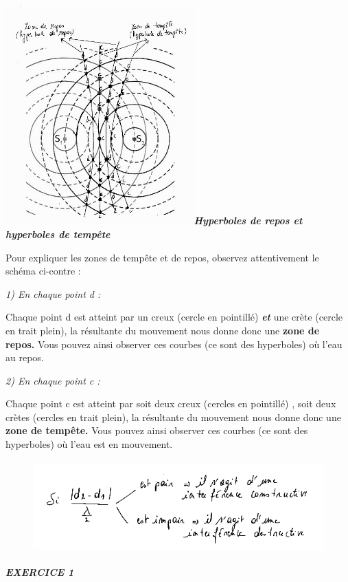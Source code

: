 {\includegraphics[width=7.264cm,height=8.423cm]{Pictures/100000010000021B000002719784CD0CAF081F55.png}\emph{\textbf{Hyperboles
de repos et hyperboles de tempête}}

Pour expliquer les zones de tempête et de repos, observez attentivement
le schéma ci-contre :

\emph{1) En chaque point d :}

Chaque point d est atteint par un creux (cercle en pointillé)
\emph{\textbf{et}} une crète (cercle en trait plein), la résultante du
mouvement nous donne donc une \textbf{zone de repos.} Vous pouvez ainsi
observer ces courbes (ce sont des hyperboles) où l'eau au repos.

\emph{2) En chaque point c : }

Chaque point c est atteint par soit deux creux (cercles en pointillé) ,
soit deux crètes (cercles en trait plein), la résultante du mouvement
nous donne donc une \textbf{zone de tempête.} Vous pouvez ainsi observer
ces courbes (ce sont des hyperboles) où l'eau est en mouvement.

\begin{figure}
\centering
\includegraphics[width=13.005cm,height=3.542cm]{Pictures/1000000100000220000000A31734CD7DA5F285B4.png}
\caption{}
\end{figure}

\emph{\textbf{EXERCICE 1}}

}
